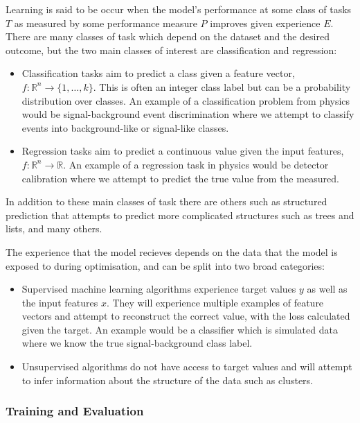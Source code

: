 Learning is said to be occur when the model's performance at some class of tasks $T$ as measured by some performance measure $P$ improves given experience $E$. 
There are many classes of task which depend on the dataset and the desired outcome, but the two main classes of interest are classification and regression:
\begin{itemize}[leftmargin=.5in,noitemsep]
    \item Classification tasks aim to predict a class given a feature vector, $f:\mathds{R}^{n}\rightarrow{}\{1,\dots,k\}$.
This is often an integer class label but can be a probability distribution over classes. An example of a classification problem from physics would be signal-background event discrimination where we attempt to classify events into background-like or signal-like classes.
    \item Regression tasks aim to predict a continuous value given the input features, $f:\mathds{R}^{n}\rightarrow\mathds{R}$. An example of a regression task in physics would be detector calibration where we attempt to predict the true value from the measured. 
\end{itemize}
In addition to these main classes of task there are others such as structured prediction that attempts to predict more complicated structures such as trees and lists, and many others. 


The experience that the model recieves depends on the data that the model is exposed to during optimisation, and can be split into two broad categories:
\begin{itemize}[leftmargin=.5in,noitemsep]
    \item Supervised machine learning algorithms experience target values $y$ as well as the input features $x$. They will experience multiple examples of feature vectors and attempt to reconstruct the correct value, with the loss calculated given the target. An example would be a classifier which is simulated data where we know the true signal-background class label. 
    \item Unsupervised algorithms do not have access to target values and will attempt to infer information about the structure of the data such as clusters.
\end{itemize}



\subsubsection{Training and Evaluation}

